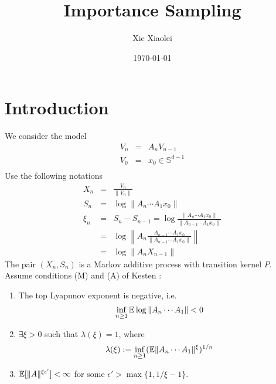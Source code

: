 \documentclass{article}
\title{Importance Sampling}
\author{Xie Xiaolei}
\date{\today}
\begin{document}
\maketitle
\section{Introduction}
We consider the model
\begin{eqnarray*}
V_n &=& A_n V_{n-1} \\
V_0 &=& x_0 \in \mathbb S^{d-1}\\
\end{eqnarray*}
Use the following notations
\begin{eqnarray*}
X_n &=& \frac{V_n}{\|V_n\|} \\
S_n &=& \log \|A_n \cdots A_1 x_0\| \\
\xi_n &=& S_n - S_{n-1} = \log\frac{\|A_n \cdots A_1 x_0\|}{\|A_{n-1}
  \cdots A_1 x_0\|} \\
&=& \log\left\| A_n \frac{A_{n-1} \cdots A_1 x_0}{\|A_{n-1} \cdots A_1
    x_0\|} \right\|\\
&=& \log \|A_n X_{n-1}\|
\end{eqnarray*}
The pair $(X_n, S_n)$ is a Markov additive process with transition
kernel $P$. Assume conditions (M) and (A) of Kesten \cite{Kesten1973}:
\begin{enumerate}
\item The top Lyapunov exponent is negative, i.e.
  \begin{equation}
    \label{eq:neg_top_Lyapunov}
    \inf_{n \geq 1} \mathbb{E} \log \|A_n \cdots A_1\| < 0    
  \end{equation}
\item $\exists \xi > 0$ such that $\lambda(\xi) = 1$, where
  $$
  \lambda(\xi) := \inf_{n \geq 1} (\mathbb{E} \|A_n \cdots A_1\|^\xi)^{1/n}
  $$
\item $\mathbb{E}[\|A\|^{\xi\epsilon'}] < \infty$ for some $\epsilon' >
  \max\{1, 1/\xi - 1\}$.

\end{enumerate}
\end{document}
